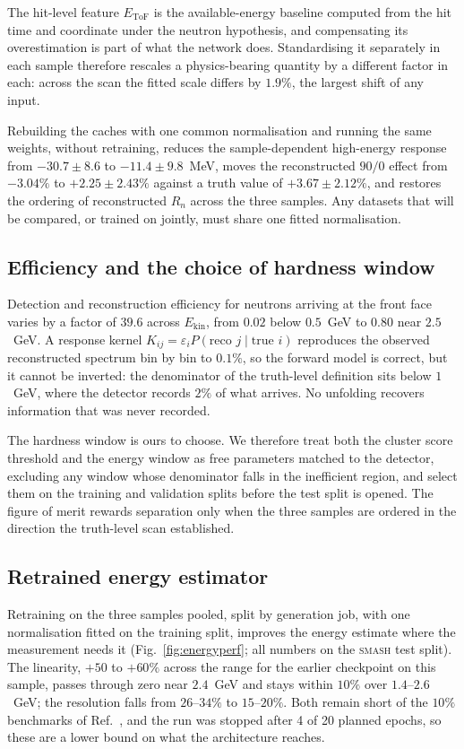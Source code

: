 \documentclass[aps,prc,twocolumn,superscriptaddress,showpacs,%
               nofootinbib,floatfix,longbibliography]{revtex4-2}
\newcommand{\Ekin}{E_{\text{kin}}}
\newcommand{\SMASH}{\textsc{smash}}
\begin{document}
The hit-level feature $E_{\text{ToF}}$ is the available-energy baseline
computed from the hit time and coordinate under the neutron hypothesis,
and compensating its overestimation is part of what the network does.
Standardising it separately in each sample therefore rescales a
physics-bearing quantity by a different factor in each: across the scan
the fitted scale differs by $1.9\%$, the largest shift of any input.

Rebuilding the caches with one common normalisation and running the
same weights, without retraining, reduces the sample-dependent
high-energy response from $-30.7 \pm 8.6$ to $-11.4 \pm 9.8$~MeV, moves
the reconstructed $90/0$ effect from $-3.04\%$ to $+2.25 \pm 2.43\%$
against a truth value of $+3.67 \pm 2.12\%$, and restores the ordering
of reconstructed $R_n$ across the three samples.  Any datasets that will
be compared, or trained on jointly, must share one fitted
normalisation.

\subsection{Efficiency and the choice of hardness window}

Detection and reconstruction efficiency for neutrons arriving at the
front face varies by a factor of $39.6$ across $\Ekin$, from $0.02$
below $0.5$~GeV to $0.80$ near $2.5$~GeV.  A response kernel
$K_{ij} = \varepsilon_i P(\text{reco } j \mid \text{true } i)$
reproduces the observed reconstructed spectrum bin by bin to $0.1\%$,
so the forward model is correct, but it cannot be inverted: the
denominator of the truth-level definition sits below $1$~GeV, where the
detector records $2\%$ of what arrives.  No unfolding recovers
information that was never recorded.

The hardness window is ours to choose.  We therefore treat both the
cluster score threshold and the energy window as free parameters
matched to the detector, excluding any window whose denominator falls
in the inefficient region, and select them on the training and
validation splits before the test split is opened.  The figure of merit
rewards separation only when the three samples are ordered in the
direction the truth-level scan established.

\subsection{Retrained energy estimator}

Retraining on the three samples pooled, split by generation job, with
one normalisation fitted on the training split, improves the energy
estimate where the measurement needs it
(Fig.~\ref{fig:energyperf}; all numbers on the \SMASH{} test split).
The linearity, $+50$ to $+60\%$ across the range for the earlier
checkpoint on this sample, passes through zero near $2.4$~GeV and
stays within $10\%$ over $1.4$--$2.6$~GeV; the resolution falls from
$26$--$34\%$ to $15$--$20\%$.  Both remain short of the $10\%$
benchmarks of Ref.~\cite{Morozov2024HGND}, and the run was stopped after
4 of 20 planned epochs, so these are a lower bound on what the
architecture reaches.
\end{document}
